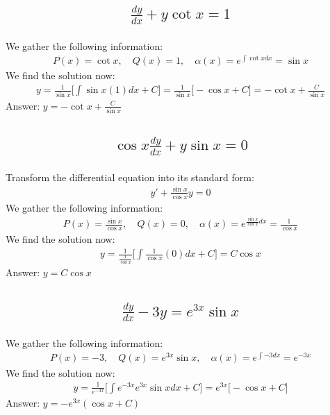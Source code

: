 \documentclass{article}
\begin{document}
\subsection{
	\begin{align*}
		\frac{dy}{dx} + y\cot{x} = 1
	\end{align*}
}
We gather the following information:
\begin{align*}
	P(x) = \cot{x}, \quad Q(x) = 1, \quad \alpha(x) = e^{\int{\cot{x}dx}} = \sin{x}
\end{align*}
We find the solution now:
\begin{align*}
	y = \frac{1}{\sin{x}} \bigg[ \int{\sin{x}(1)dx} + C \bigg] = \frac{1}{\sin{x}} \bigg[ -\cos{x} + C \bigg] = -\cot{x} + \frac{C}{\sin{x}}
\end{align*}
Answer: $y = - \cot{x} + \frac{C}{\sin{x}}$

\subsection{
	\begin{align*}
		\cos{x} \frac{dy}{dx} + y\sin{x} = 0
	\end{align*}
}
Transform the differential equation into its standard form:
\begin{align*}
	y' + \frac{\sin{x}}{\cos{x}}y = 0
\end{align*}
We gather the following information:
\begin{align*}
	P(x) = \frac{\sin{x}}{\cos{x}}, \quad Q(x) = 0, \quad \alpha(x) = e^{\frac{\sin{x}}{\cos{x}}dx} = \frac{1}{\cos{x}}
\end{align*}
We find the solution now:
\begin{align*}
	y = \frac{1}{\frac{1}{\cos{x}}} \bigg[ \int{\frac{1}{\cos{x}}(0)dx} + C \bigg] = C\cos{x}
\end{align*}
Answer: $y = C \cos{x}$

\subsection{
	\begin{align*}
		\frac{dy}{dx} -3y = e^{3x}\sin{x}
	\end{align*}
}
We gather the following information:
\begin{align*}
	P(x) = -3, \quad Q(x) = e^{3x}\sin{x}, \quad \alpha(x) = e^{\int{-3dx}} = e^{-3x}
\end{align*}
We find the solution now:
\begin{align*}
	y = \frac{1}{e^{-3x}} \bigg[ \int{e^{-3x}e^{3x}\sin{x}dx} + C \bigg] = e^{3x} \bigg[ -\cos{x} + C \bigg]
\end{align*}
Answer: $y = -e^{3x} (\cos{x} + C)$
\end{document}
